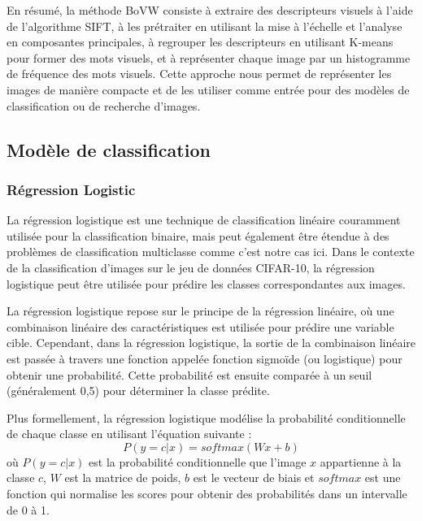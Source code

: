 En résumé, la méthode BoVW consiste à extraire des descripteurs visuels à l'aide de l'algorithme SIFT, à les prétraiter en utilisant la mise à l'échelle et l'analyse en composantes principales, à regrouper les descripteurs en utilisant K-means pour former des mots visuels, et à représenter chaque image par un histogramme de fréquence des mots visuels. Cette approche nous permet de représenter les images de manière compacte et de les utiliser comme entrée pour des modèles de classification ou de recherche d'images.


\subsection{Modèle de classification}
\subsubsection{Régression Logistic}
La régression logistique est une technique de classification linéaire couramment utilisée pour la classification binaire, mais peut également être étendue à des problèmes de classification multiclasse comme c'est notre cas ici. Dans le contexte de la classification d'images sur le jeu de données CIFAR-10, la régression logistique peut être utilisée pour prédire les classes correspondantes aux images.

La régression logistique repose sur le principe de la régression linéaire, où une combinaison linéaire des caractéristiques est utilisée pour prédire une variable cible. Cependant, dans la régression logistique, la sortie de la combinaison linéaire est passée à travers une fonction appelée fonction sigmoïde (ou logistique) pour obtenir une probabilité. Cette probabilité est ensuite comparée à un seuil (généralement 0,5) pour déterminer la classe prédite.

Plus formellement, la régression logistique modélise la probabilité conditionnelle de chaque classe en utilisant l'équation suivante :
\begin{equation}
P(y = c | x) = softmax(Wx + b)
\end{equation}
où $P(y = c | x)$ est la probabilité conditionnelle que l'image $x$ appartienne à la classe $c$, $W$ est la matrice de poids, $b$ est le vecteur de biais et $softmax$ est une fonction qui normalise les scores pour obtenir des probabilités dans un intervalle de 0 à 1.

